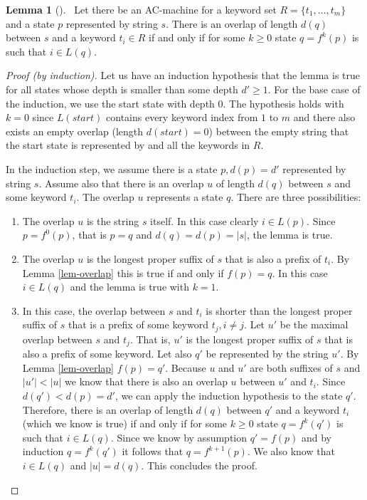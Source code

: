 \documentclass[english,twoside,censored,csm,algorithms-track-2020]{HYthesisML}
\theoremstyle{plain}
\theoremstyle{definition}
\newtheorem{lemma}[theorem]{Lemma}
\begin{document}


\begin{lemma}[]~\label{lem-overlap-length}
  Let there be an AC-machine for a keyword set $R=\{t_1,...,t_m\}$ and a state $p$ represented
  by string $s$.
  There is an overlap of length $d(q)$ between $s$ and a keyword $t_i\in R$ if and only if
  for some $k \geq 0$ state $q=f^k(p)$ is such that $i\in L(q)$.
\end{lemma}
\begin{proof}[Proof (by induction)]
  Let us have an induction hypothesis that the lemma is true for all states whose depth is
  smaller than some depth $d'\geq 1$. For the base case of the induction, we use the start state
  with depth 0. The hypothesis holds
  with $k=0$ since $L(start)$ contains every keyword index from $1$ to $m$ and there also exists an empty
  overlap (length $d(start)=0$) between the empty string that the start state is represented by and all
  the keywords in $R$.

  In the induction step, we assume there is a state $p, d(p) = d'$ represented by string $s$.
  Assume also that there is an overlap $u$ of length $d(q)$ between $s$ and some keyword $t_i$. The
  overlap $u$ represents a state $q$.
  There are three possibilities:
  \begin{enumerate}[leftmargin=28pt]
  \item The overlap $u$ is the string $s$ itself. In this case clearly $i\in L(p)$. Since
    $p=f^0(p)$, that is $p=q$ and $d(q) = d(p) = |s|$, the lemma is true. 
  \item The overlap $u$ is the longest proper suffix of $s$ that is also a prefix of $t_i$.
    By Lemma \ref{lem-overlap} this is true if and only if $f(p) = q$. In this case
    $i\in L(q)$ and the lemma is true with $k=1$.
  \item In this case, the overlap between $s$ and $t_i$ is shorter than the longest proper
    suffix of $s$ that is a prefix of some keyword $t_j, i\neq j$. Let $u'$ be the maximal
    overlap between $s$ and $t_j$. That is, $u'$ is the longest proper suffix of $s$ that is also
    a prefix of some keyword. Let also $q'$ be represented by the string $u'$. By Lemma
    \ref{lem-overlap} $f(p) = q'$. Because $u$ and $u'$ are both suffixes of $s$ and $|u'|<|u|$ we
    know that there is also an overlap $u$ between $u'$ and $t_i$. Since $d(q') < d(p) = d'$, we can
    apply the induction hypothesis to the state $q'$. Therefore, there is an overlap of length
    $d(q)$ between $q'$ and a keyword $t_i$ (which we know is true) if and only if for some
    $k \geq 0$ state $q=f^k(q')$ is such that $i\in L(q)$. Since we know by assumption $q'=f(p)$ and
    by induction $q=f^k(q')$ it follows that $q=f^{k+1}(p)$. We also know that $i\in L(q)$ and
    $|u|=d(q)$. This concludes the proof.
    

\end{enumerate}
\end{proof}
\end{document}
